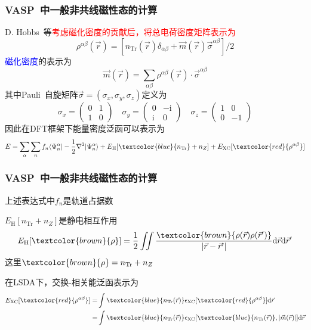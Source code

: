 \frame
{
	\frametitle{\textrm{VASP~}中一般非共线磁性态的计算}
	\textrm{D. Hobbs~}等\textcolor{red}{考虑磁化密度的贡献后，将总电荷密度矩阵表示为}
	\begin{displaymath}
		\rho^{\alpha\beta}(\vec r)=\left[n_{\mathrm{Tr}}(\vec r)\delta_{\alpha\beta}+\vec m(\vec r)\vec{\sigma}^{\alpha\beta}\right]/2
	\end{displaymath}
	\textcolor{blue}{磁化密度}的表示为
	\begin{displaymath}
		\vec m(\vec r)=\sum_{\alpha\beta}\rho^{\alpha\beta}(\vec r)\cdot\vec{\sigma}^{\alpha\beta}
	\end{displaymath}
	其中\textrm{Pauli~}自旋矩阵$\vec{\sigma}=(\sigma_x,\sigma_y,\sigma_z)$定义为
	\begin{displaymath}
		\sigma_x=\left( 
		\begin{matrix}
			0 &1\\
			1 &0
		\end{matrix}
		\right)\quad
		\sigma_y=\left( 
		\begin{matrix}
			0 &-\mathrm{i}\\
			\mathrm{i} &0
		\end{matrix}
		\right)\quad
		\sigma_z=\left( 
		\begin{matrix}
			1 &0\\
			0 &-1
		\end{matrix}
		\right)
	\end{displaymath}
	因此在\textrm{DFT}框架下能量密度泛函可以表示为
	\begin{displaymath}
		E=\sum_{\alpha}\sum_{n}f_n\langle\Psi_n^{\alpha}|-\frac12\nabla^2|\Psi_n^{\alpha}\rangle+E_{\mathrm{H}}[\textcolor{blue}{n_{\mathrm{Tr}}}+n_Z]+E_{\mathrm{XC}}[\textcolor{red}{\rho^{\alpha\beta}}]
	\end{displaymath}
}

\frame
{
	\frametitle{\textrm{VASP~}中一般非共线磁性态的计算}
	上述表达式中$f_n$是轨道占据数
	
	$E_{\mathrm{H}}[n_{\mathrm{Tr}}+n_Z]$是静电相互作用
	\begin{displaymath}
		E_{\mathrm{H}}[\textcolor{brown}{\rho}]=\frac12\iint\frac{\textcolor{brown}{\rho(\vec r)\rho(\vec r^{\prime})}}{|\vec r-\vec r^{\prime}|}\mathrm{d}\vec r\mathrm{d}\vec r^{\prime}
	\end{displaymath}
	这里$\textcolor{brown}{\rho}=n_{\mathrm{Tr}}+n_Z$

	在\textrm{LSDA}下，交换-相关能泛函表示为
	\begin{displaymath}
		\begin{aligned}
			E_{\mathrm{XC}}[\textcolor{red}{\rho^{\alpha\beta}}]=&\int\textcolor{blue}{n_{\mathrm{Tr}}(\vec r)}\epsilon_{\mathrm{XC}}[\textcolor{red}{\rho^{\alpha\beta}}]\mathrm{d}\vec r\\
			=&\int\textcolor{blue}{n_{\mathrm{Tr}}(\vec r)}\epsilon_{\mathrm{XC}}[\textcolor{blue}{n_{\mathrm{Tr}}(\vec r)},|\vec m(\vec r)|]\mathrm{d}\vec r
		\end{aligned}
	\end{displaymath}
}

